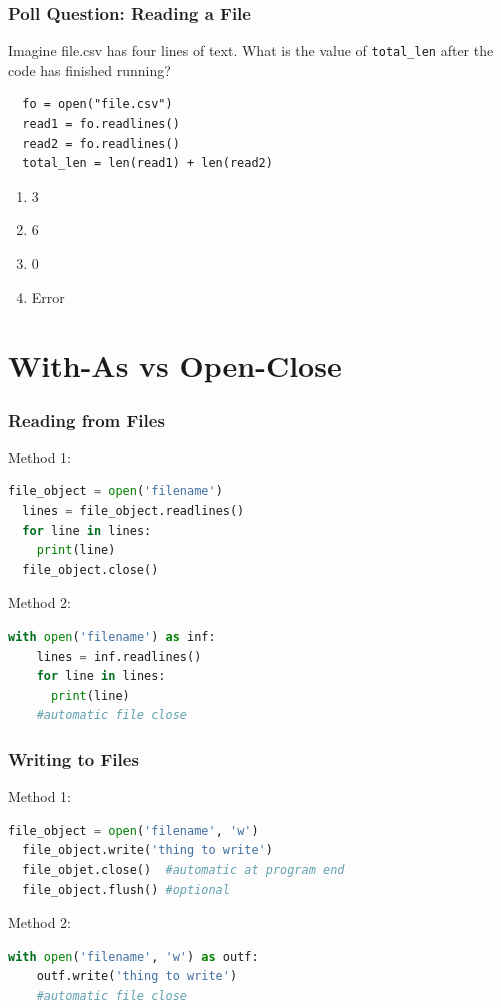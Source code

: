 \documentclass{beamer}
\begin{document}
%
%
\begin{frame}[fragile]
  \frametitle{Poll Question: Reading a File}
  Imagine file.csv has four lines of text. What is the value of \lstinline|total_len| after the code has finished running?
  \begin{lstlisting}
  fo = open("file.csv")
  read1 = fo.readlines()
  read2 = fo.readlines()
  total_len = len(read1) + len(read2)
  \end{lstlisting} 
  \vfill
  \begin{enumerate}[A]
    \item 3
    \item 6
    \item 0
    \item Error
  \end{enumerate}
\end{frame}


\section{With-As vs Open-Close}
%
%
\begin{frame}[fragile]
  \frametitle{Reading from Files}
  Method 1:
  \begin{lstlisting}[language=Python, autogobble]
  file_object = open('filename')
  lines = file_object.readlines()
  for line in lines:
    print(line)
  file_object.close()
  \end{lstlisting}
  \vfill
  Method 2:
  \begin{lstlisting}[language=Python, autogobble]
  with open('filename') as inf:
    lines = inf.readlines()
    for line in lines:
      print(line)
    #automatic file close
  \end{lstlisting}
\end{frame}

%
%
\begin{frame}[fragile]
  \frametitle{Writing to Files}
  Method 1:
  \begin{lstlisting}[language=Python, autogobble]
  file_object = open('filename', 'w')
  file_object.write('thing to write')
  file_objet.close()  #automatic at program end
  file_object.flush() #optional
  \end{lstlisting}
  \vfill
  Method 2:
  \begin{lstlisting}[language=Python, autogobble]
  with open('filename', 'w') as outf:
    outf.write('thing to write')
    #automatic file close
  \end{lstlisting}
\end{frame}
\end{document}
